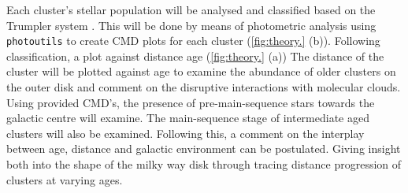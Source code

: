 Each cluster's stellar population will be analysed and classified based on the Trumpler system \citep{1930LicOB..14..154T}. This will be done by means of photometric analysis using \verb|photoutils| to create CMD plots for each cluster (\cref{fig:theory.} (b)). Following classification, a plot against distance age (\cref{fig:theory.} (a)) The distance of the cluster will be plotted against age to examine the abundance of older clusters on the outer disk and comment on the disruptive interactions with molecular clouds. Using provided CMD's, the presence of pre-main-sequence stars towards the galactic centre will examine. The main-sequence stage of intermediate aged clusters will also be examined. Following this, a comment on the interplay between age, distance and galactic environment can be postulated. Giving insight both into the shape of the milky way disk through tracing distance progression of clusters at varying ages. 

